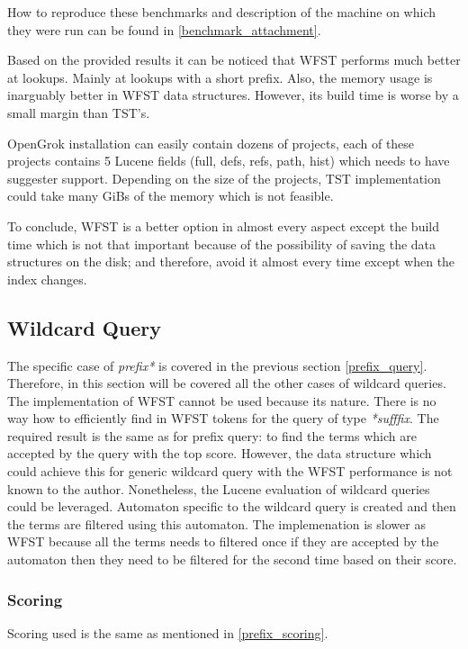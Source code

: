 How to reproduce these benchmarks and description of the machine on which they were run can be found in \ref{benchmark_attachment}.

Based on the provided results it can be noticed that WFST performs much better at lookups. Mainly at lookups with a short prefix.
Also, the memory usage is inarguably better in WFST data structures. However, its build time is worse by a small margin than TST's.

OpenGrok installation can easily contain dozens of projects, each of these projects contains 5 Lucene fields
(full, defs, refs, path, hist) which needs to have suggester support. Depending on the size of the projects,
TST implementation could take many GiBs of the memory which is not feasible.

To conclude, WFST is a better option in almost every aspect except the build time which is not that important because of
the possibility of saving the data structures on the disk; and therefore, avoid it almost every time except when the index changes.

\subsection{Wildcard Query}
\label{wildcard_query}
The specific case of \textit{prefix*} is covered in the previous section \ref{prefix_query}. Therefore, in this section
will be covered all the other cases of wildcard queries. The implementation of WFST cannot be used because its nature.
There is no way how to efficiently find in WFST tokens for the query of type \textit{*sufffix}. The required result is
the same as for prefix query: to find the terms which are accepted by the query with the top score. However, the data
structure which could achieve this for generic wildcard query with the WFST performance is not known to the author.
Nonetheless, the Lucene evaluation of wildcard queries could be leveraged. Automaton specific to the wildcard query is
created and then the terms are filtered using this automaton. The implemenation is slower as WFST because all the terms
needs to filtered once if they are accepted by the automaton then they need to be filtered for the second time based on
their score.

\subsubsection{Scoring}
Scoring used is the same as mentioned in \ref{prefix_scoring}.

